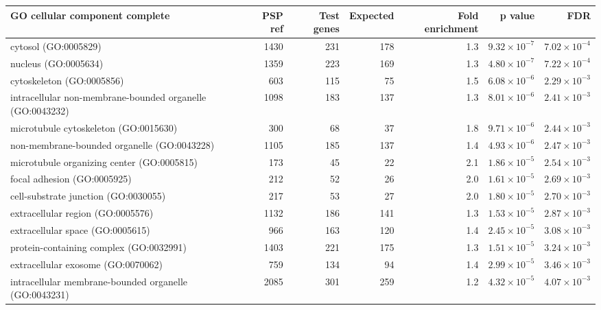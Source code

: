 \begin{table}[ht]
\centering
\begin{adjustbox}{width=\textwidth}
\begin{tabular}{lrrrrrr}
  \hline
GO cellular component complete & PSP ref & Test genes & Expected & Fold enrichment & p value & FDR \\ 
  \hline
cytosol (GO:0005829) & 1430 & 231 & 178 & 1.3 & $9.32 \times 10^{-7}$ & $7.02 \times 10^{-4}$ \\ 
  nucleus (GO:0005634) & 1359 & 223 & 169 & 1.3 & $4.80 \times 10^{-7}$ & $7.22 \times 10^{-4}$ \\ 
  cytoskeleton (GO:0005856) & 603 & 115 & 75 & 1.5 & $6.08 \times 10^{-6}$ & $2.29 \times 10^{-3}$ \\ 
  intracellular non-membrane-bounded organelle (GO:0043232) & 1098 & 183 & 137 & 1.3 & $8.01 \times 10^{-6}$ & $2.41 \times 10^{-3}$ \\ 
  microtubule cytoskeleton (GO:0015630) & 300 & 68 & 37 & 1.8 & $9.71 \times 10^{-6}$ & $2.44 \times 10^{-3}$ \\ 
  non-membrane-bounded organelle (GO:0043228) & 1105 & 185 & 137 & 1.4 & $4.93 \times 10^{-6}$ & $2.47 \times 10^{-3}$ \\ 
  microtubule organizing center (GO:0005815) & 173 & 45 & 22 & 2.1 & $1.86 \times 10^{-5}$ & $2.54 \times 10^{-3}$ \\ 
  focal adhesion (GO:0005925) & 212 & 52 & 26 & 2.0 & $1.61 \times 10^{-5}$ & $2.69 \times 10^{-3}$ \\ 
  cell-substrate junction (GO:0030055) & 217 & 53 & 27 & 2.0 & $1.80 \times 10^{-5}$ & $2.70 \times 10^{-3}$ \\ 
  extracellular region (GO:0005576) & 1132 & 186 & 141 & 1.3 & $1.53 \times 10^{-5}$ & $2.87 \times 10^{-3}$ \\ 
  extracellular space (GO:0005615) & 966 & 163 & 120 & 1.4 & $2.45 \times 10^{-5}$ & $3.08 \times 10^{-3}$ \\ 
  protein-containing complex (GO:0032991) & 1403 & 221 & 175 & 1.3 & $1.51 \times 10^{-5}$ & $3.24 \times 10^{-3}$ \\ 
  extracellular exosome (GO:0070062) & 759 & 134 & 94 & 1.4 & $2.99 \times 10^{-5}$ & $3.46 \times 10^{-3}$ \\ 
  intracellular membrane-bounded organelle (GO:0043231) & 2085 & 301 & 259 & 1.2 & $4.32 \times 10^{-5}$ & $4.07 \times 10^{-3}$ \\ 

\end{tabular}
\end{adjustbox}
\end{table}
